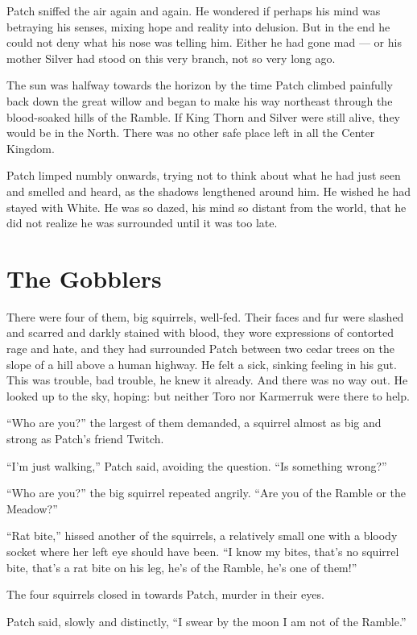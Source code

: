 \documentclass[ebook,oneside,openany,17pt]{memoir}
\newenvironment{tolerant}[1]{%
  \par\tolerance=#1\relax
}{%
  \par
}
\renewcommand{\thechapter}{\Roman{chapter}}
\newcounter{sections}
\newcommand{\sections}[1]{%
  \section*{#1}
  \addtocounter{sections}{1}%
  \pdfbookmark[1]{#1}{section.\thechapter.\thesections}}
\begin{document}
Patch sniffed the air again and again. He wondered if perhaps his mind
was betraying his senses, mixing hope and reality into delusion. But
in the end he could not deny what his nose was telling him. Either he
had gone mad — or his mother Silver had stood on this very branch, not
so very long ago.

The sun was halfway towards the horizon by the time Patch climbed
painfully back down the great willow and began to make his way
northeast through the blood-soaked hills of the Ramble. If King Thorn
and Silver were still alive, they would be in the North. There was no
other safe place left in all the Center Kingdom.

\begin{tolerant}{2000}
Patch limped numbly onwards, trying not to think about what he had
just seen and smelled and heard, as the shadows lengthened around
him. He wished he had stayed with White. He was so dazed, his mind so
distant from the world, that he did not realize he was surrounded
until it was too late.
\end{tolerant}


\sections{The Gobblers}

There were four of them, big squirrels, well-fed. Their faces and fur
were slashed and scarred and darkly stained with blood, they wore
expressions of contorted rage and hate, and they had surrounded Patch
between two cedar trees on the slope of a hill above a human
highway. He felt a sick, sinking feeling in his gut. This was trouble,
bad trouble, he knew it already. And there was no way out. He looked
up to the sky, hoping: but neither Toro nor Karmerruk were there to
help.

“Who are you?” the largest of them demanded, a squirrel almost as big
and strong as Patch’s friend Twitch.

“I’m just walking,” Patch said, avoiding the question. “Is something
wrong?”

“Who are you?” the big squirrel repeated angrily. “Are you of the
Ramble or the Meadow?”

“Rat bite,” hissed another of the squirrels, a relatively small one
with a bloody socket where her left eye should have been. “I know my
bites, that’s no squirrel bite, that’s a rat bite on his leg, he’s of
the Ramble, he’s one of them!”

The four squirrels closed in towards Patch, murder in their eyes.

Patch said, slowly and distinctly, “I swear by the moon I am not of
the Ramble.”
\end{document}

